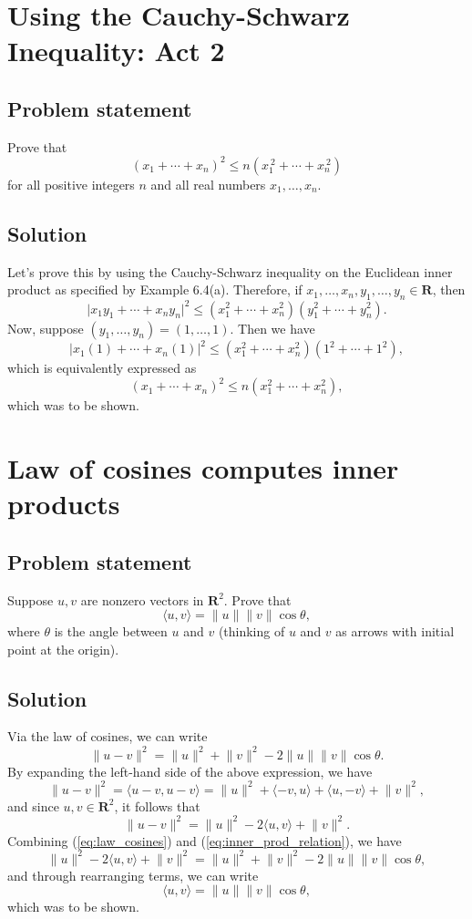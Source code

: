 \documentclass{article}
\providecommand{\abs}[1]{\lvert#1\rvert} \providecommand{\norm}[1]{\lVert#1\rVert}
\begin{document}
\clearpage

\section{Using the Cauchy-Schwarz Inequality: Act 2}
\subsection*{Problem statement}
Prove that
\[(x_1+\cdots+x_n)^2\leq n(x_1^{\:2}+\cdots+x_n^{\:2})\]
for all positive integers $n$ and all real numbers $x_1,\ldots,x_n$.

\subsection*{Solution}
Let's prove this by using the Cauchy-Schwarz inequality on the Euclidean inner product as specified by Example 6.4(a). 
Therefore, if $x_1,\ldots,x_n,y_1,\ldots,y_n\in\mathbf{R}$, then
\[\abs{x_1y_1+\cdots+x_ny_n}^2\leq (x_1^2+\cdots+x_n^2)(y_1^2+\cdots+y_n^2).\]
Now, suppose $(y_1,\ldots,y_n)=(1,\ldots,1)$. 
Then we have
\[\abs{x_1(1)+\cdots+x_n(1)}^2\leq (x_1^2+\cdots+x_n^2)(1^2+\cdots+1^2),\]
which is equivalently expressed as
\[(x_1+\cdots+x_n)^2\leq n(x_1^2+\cdots+x_n^2),\]
which was to be shown.

\clearpage

\section{Law of cosines computes inner products}
\subsection*{Problem statement}
Suppose $u,v$ are nonzero vectors in $\mathbf{R}^2$.
Prove that
\[\langle u,v\rangle=\norm{u}\norm{v}\cos\theta,\]
where $\theta$ is the angle between $u$ and $v$ (thinking of $u$ and $v$ as arrows with initial point at the origin).

\subsection*{Solution}
Via the law of cosines, we can write
\begin{equation}\label{eq:law_cosines}
    \norm{u-v}^2=\norm{u}^2+\norm{v}^2-2\norm{u}\norm{v}\cos\theta.
\end{equation}
By expanding the left-hand side of the above expression, we have
\[\norm{u-v}^2=\langle u-v,u-v \rangle=\norm{u}^2+\langle-v,u\rangle + \langle u,-v \rangle +\norm{v}^2,\]
and since $u,v\in\mathbf{R}^2$, it follows that
\begin{equation}\label{eq:inner_prod_relation}
    \norm{u-v}^2=\norm{u}^2-2\langle u,v \rangle +\norm{v}^2.
\end{equation}
Combining (\ref{eq:law_cosines}) and (\ref{eq:inner_prod_relation}), we have
\[\norm{u}^2-2\langle u,v \rangle +\norm{v}^2=\norm{u}^2+\norm{v}^2-2\norm{u}\norm{v}\cos\theta,\]
and through rearranging terms, we can write
\[\langle u,v\rangle=\norm{u}\norm{v}\cos\theta,\]
which was to be shown.
\end{document}
